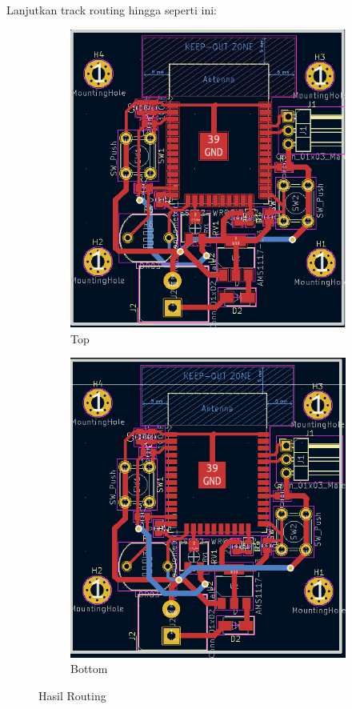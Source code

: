 \documentclass[12pt]{book}
\begin{document}
	\newpage
	Lanjutkan track routing hingga seperti ini:

	\begin{figure}[!ht]
		\centering
		\begin{subfigure}[t]{0.45\textwidth}
			\includegraphics[width=\textwidth]{images/pcb/pcb_19}
			\caption{Top}
		\end{subfigure}
		\begin{subfigure}[t]{0.45\textwidth}
			\includegraphics[width=\textwidth]{images/pcb/pcb_20}
			\caption{Bottom}
		\end{subfigure}
		\caption{Hasil Routing}
	\end{figure}
\end{document}
